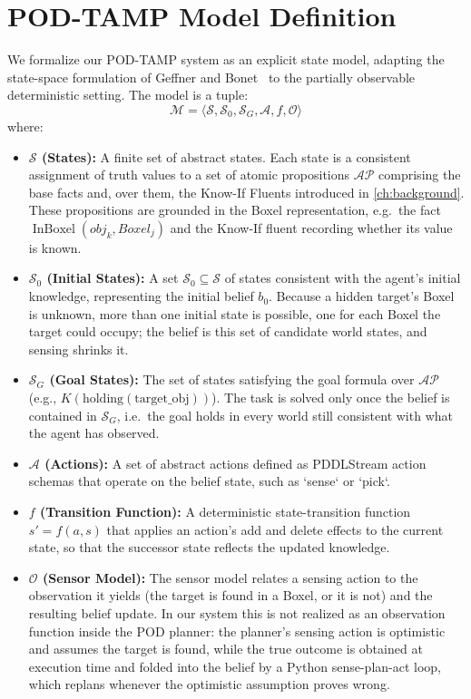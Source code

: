 \section{POD-TAMP Model Definition}
We formalize our POD-TAMP system as an explicit state model, adapting the state-space formulation of Geffner and Bonet~\cite{geffner2013concise} to the partially observable deterministic setting. The model is a tuple:
\[
\mathcal{M} = \langle \mathcal{S}, \mathcal{S}_0, \mathcal{S}_G, \mathcal{A}, f, \mathcal{O} \rangle
\]
where:
\begin{itemize}
    \item \textbf{$\mathcal{S}$ (States):} A finite set of abstract states. Each state is a consistent assignment of truth values to a set of atomic propositions $\mathcal{AP}$ comprising the base facts and, over them, the Know-If Fluents introduced in \cref{ch:background}. These propositions are grounded in the Boxel representation, e.g.\ the fact $\operatorname{InBoxel}(obj_k, Boxel_j)$ and the Know-If fluent recording whether its value is known.
    \item \textbf{$\mathcal{S}_0$ (Initial States):} A set $\mathcal{S}_0 \subseteq \mathcal{S}$ of states consistent with the agent's initial knowledge, representing the initial belief $b_0$. Because a hidden target's Boxel is unknown, more than one initial state is possible, one for each Boxel the target could occupy; the belief is this set of candidate world states, and sensing shrinks it.
    \item \textbf{$\mathcal{S}_G$ (Goal States):} The set of states satisfying the goal formula over $\mathcal{AP}$ (e.g., $K(\text{holding}(\text{target\_obj}))$). The task is solved only once the belief is contained in $\mathcal{S}_G$, i.e.\ the goal holds in every world still consistent with what the agent has observed.
    \item \textbf{$\mathcal{A}$ (Actions):} A set of abstract actions defined as PDDLStream action schemas that operate on the belief state, such as `sense` or `pick`.
    \item \textbf{$f$ (Transition Function):} A deterministic state-transition function $s' = f(a,s)$ that applies an action's add and delete effects to the current state, so that the successor state reflects the updated knowledge.
    \item \textbf{$\mathcal{O}$ (Sensor Model):} The sensor model relates a sensing action to the observation it yields (the target is found in a Boxel, or it is not) and the resulting belief update. In our system this is not realized as an observation function inside the POD planner: the planner's sensing action is optimistic and assumes the target is found, while the true outcome is obtained at execution time and folded into the belief by a Python sense-plan-act loop, which replans whenever the optimistic assumption proves wrong.
\end{itemize}
